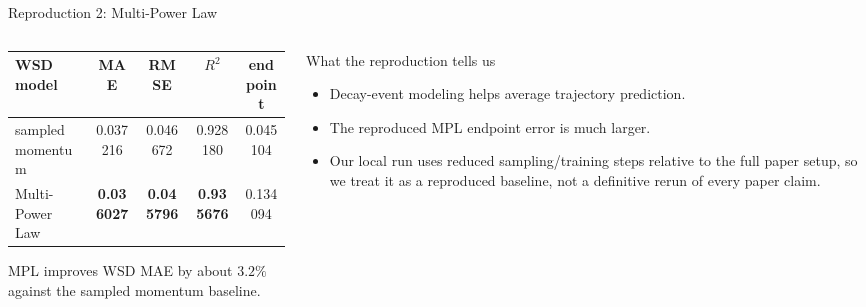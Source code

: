 \documentclass[fontset=fandol,aspectratio=169,10pt]{ctexbeamer}
\newcommand{\smallnote}[1]{{\scriptsize\color{tdltGray}#1}}
\begin{document}
\begin{frame}{Reproduction 2: Multi-Power Law}
  \begin{columns}[T,onlytextwidth]
    \begin{column}{0.50\textwidth}
      \begin{table}
        \centering
        \scriptsize
        \begin{tabular}{lcccc}
          \toprule
          WSD model & MAE & RMSE & \(R^2\) & endpoint\\
          \midrule
          sampled momentum & 0.037216 & 0.046672 & 0.928180 & 0.045104\\
          Multi-Power Law & \textbf{0.036027} & \textbf{0.045796} & \textbf{0.935676} & 0.134094\\
          \bottomrule
        \end{tabular}
      \end{table}
      \smallnote{MPL improves WSD MAE by about \(3.2\%\) against the sampled momentum baseline.}
    \end{column}
    \begin{column}{0.48\textwidth}
      \begin{block}{What the reproduction tells us}
        \begin{itemize}
          \item Decay-event modeling helps average trajectory prediction.
          \item The reproduced MPL endpoint error is much larger.
          \item Our local run uses reduced sampling/training steps relative to the full paper setup, so we treat it as a reproduced baseline, not a definitive rerun of every paper claim.
        \end{itemize}
      \end{block}
    \end{column}
  \end{columns}
\end{frame}
\end{document}
